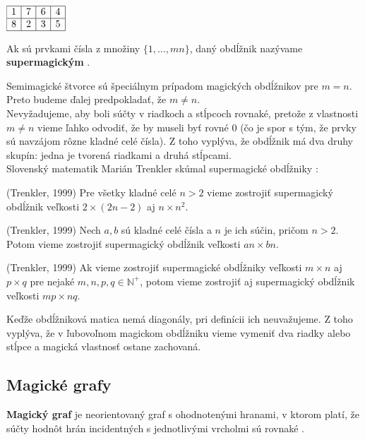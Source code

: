 \begin{center}
$\begin{array}{ |c|c|c|c| } 
\hline
1 & 7 & 6 & 4 \\ 
\hline
8 & 2 & 3 & 5 \\
\hline
\end{array}$
\end{center}

\begin{definition} Ak sú prvkami čísla z množiny $\{1, \dots, mn\}$, daný obdĺžnik nazývame \textbf{supermagickým} \cite{rectangles}.
\end{definition}

Semimagické štvorce sú špeciálnym prípadom magických obdĺžnikov pre $m = n$. Preto budeme ďalej predpokladať, že $m \neq n$. \\

Nevyžadujeme, aby boli súčty v riadkoch a stĺpcoch rovnaké, pretože z vlastnosti $m \neq n$ vieme ľahko odvodiť, že by museli byť rovné $0$ (čo je spor s tým, že prvky sú navzájom rôzne kladné celé čísla). Z toho vyplýva, že obdĺžnik má dva druhy skupín: jedna je tvorená riadkami a druhá stĺpcami. \\

Slovenský matematik Marián Trenkler skúmal supermagické obdĺžniky \cite{rectangles}:

\begin{theorem} (Trenkler, 1999) Pre všetky kladné celé $n > 2$ vieme zostrojiť supermagický obdĺžnik veľkosti $2 \times (2n - 2)$ aj $n \times n^2$.
\end{theorem}

\begin{theorem} (Trenkler, 1999) Nech $a,b$ sú kladné celé čísla a $n$ je ich súčin, pričom $n > 2$. Potom vieme zostrojiť supermagický obdĺžnik veľkosti $an \times bn$.
\end{theorem}

\begin{theorem} (Trenkler, 1999) Ak vieme zostrojiť supermagické obdĺžniky veľkosti $m \times n$ aj $p \times q$ pre nejaké $m,n,p,q \in \mathbb{N^+}$, potom vieme zostrojiť aj supermagický obdĺžnik veľkosti $mp \times nq$.
\end{theorem}

Keďže obdĺžniková matica nemá diagonály, pri definícii ich neuvažujeme. Z toho vyplýva, že v ľubovoľnom magickom obdĺžniku vieme vymeniť dva riadky alebo stĺpce a magická vlastnosť ostane zachovaná.

\subsection{Magické grafy}
\begin{definition} \textbf{Magický graf} je neorientovaný graf s ohodnotenými hranami, v ktorom platí, že súčty hodnôt hrán incidentných s jednotlivými vrcholmi sú rovnaké \cite{antimagic}.
\end{definition}

